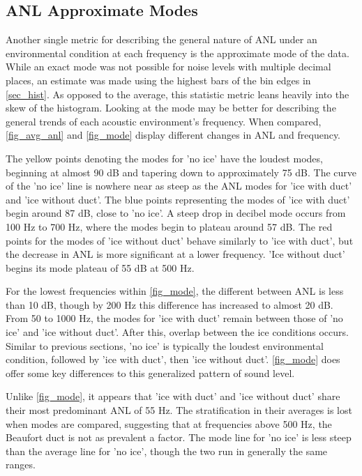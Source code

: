 \subsection{ANL Approximate Modes}

Another single metric for describing the general nature of ANL under an environmental condition at each frequency is the approximate mode of the data. While an exact mode was not possible for noise levels with multiple decimal places, an estimate was made using the highest bars of the bin edges in \autoref{sec_hist}. As opposed to the average, this statistic metric leans heavily into the skew of the histogram. Looking at the mode may be better for describing the general trends of each acoustic environment's frequency. When compared, \autoref{fig_avg_anl} and \autoref{fig_mode} display different changes in ANL and frequency. 

The yellow points denoting the modes for 'no ice' have the loudest modes, beginning at almost 90 dB and tapering down to approximately 75 dB. The curve of the 'no ice' line is nowhere near as steep as the ANL modes for 'ice with duct' and 'ice without duct'. The blue points representing the modes of 'ice with duct' begin around 87 dB, close to 'no ice'. A steep drop in decibel mode occurs from 100 Hz to 700 Hz, where the modes begin to plateau around 57 dB.  The red points for the modes of 'ice without duct' behave similarly to 'ice with duct', but the decrease in ANL is more significant at a lower frequency. 'Ice without duct' begins its mode plateau of 55 dB at 500 Hz.

For the lowest frequencies within \autoref{fig_mode}, the different between ANL is less than 10 dB, though by 200 Hz this difference has increased to almost 20 dB. From 50 to 1000 Hz, the modes for 'ice with duct' remain between those of 'no ice' and 'ice without duct'. After this, overlap between the ice conditions occurs. Similar to previous sections, 'no ice' is typically the loudest environmental condition, followed by 'ice with duct', then 'ice without duct'. \autoref{fig_mode} does offer some key differences to this generalized pattern of sound level.

Unlike \autoref{fig_mode}, it appears that 'ice with duct' and 'ice without duct' share their most predominant ANL of 55 Hz. The stratification in their averages is lost when modes are compared, suggesting that at frequencies above 500 Hz, the Beaufort duct is not as prevalent a factor. The mode line for 'no ice' is less steep than the average line for 'no ice', though the two run in generally the same ranges. 


